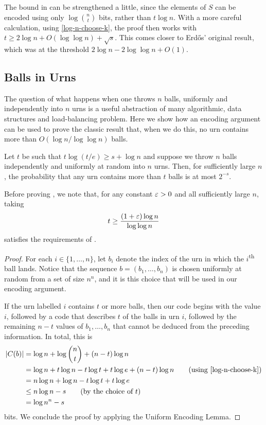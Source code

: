 \documentclass{patmorin}
\begin{document}
\begin{rem}
  The bound in  can be strengthened a little,
  since the elements of $S$ can be encoded using only
  $\log\binom{n}{t}$ bits, rather than $t\log n$.  With a more careful
  calculation, using \eqref{log-n-choose-k}, the proof then works with
  $t \ge 2\log n +O(\log\log n) + \sqrt{s}$. This comes closer to
  Erdős' original result, which was at the threshold $2\log n -
  2\log\log n + O(1)$.
\end{rem}



\subsection{Balls in Urns}

The question of what happens when one throws $n$ balls, uniformly and
independently into $n$ urns is a useful abstraction of many
algorithmic, data structures and load-balancing problem.  Here we show
how an encoding argument can be used to prove the classic result that,
when we do this, no urn contains more than $O(\log n/\log\log n)$
balls.

\begin{thm}
  Let $t$ be such that $t\log(t/e) \ge s+\log n$ and suppose we throw
  $n$ balls independently and uniformly at random into $n$ urns. Then,
  for sufficiently large $n$, the probability that any urn contains more 
  than $t$ balls is at most $2^{-s}$.
\end{thm}

Before proving , we note that, for any constant $\varepsilon
>0$ and all sufficiently large $n$, taking
\[
t \ge \frac{(1+\varepsilon)\log n}{\log\log n}
\] 
satisfies the requirements of .

\begin{proof}
  For each $i\in\{1,\ldots,n\}$, let $b_i$ denote the index of the urn
  in which the $i$\textsuperscript{th} ball lands. Notice that the sequence
  $b = (b_1,\ldots,b_n)$ is chosen uniformly at random from a set of
  size $n^n$, and it is this choice that will be used in our encoding
  argument.

  If the urn labelled $i$ contains $t$ or more balls, then our code
  begins with the value $i$, followed by a code that describes $t$ of
  the balls in urn $i$, followed by the remaining $n-t$ values of
  $b_1,\ldots,b_n$ that cannot be deduced from the preceding
  information.  In total, this is
  \begin{align*}
    |C(b)| &= \log n + \log\binom{n}{t} + (n-t)\log n \\
           &= \log n + t\log n - t\log t + t\log e + (n-t)\log n
            \tag{using \eqref{log-n-choose-k}} \\
           & = n \log n + \log n - t\log t + t\log e \\
           & \le  n\log n - s \tag{by the choice of $t$} \\
           & = \log n^n - s
  \end{align*}
  bits. We conclude the proof by applying the Uniform Encoding Lemma.
\end{proof}
\end{document}
